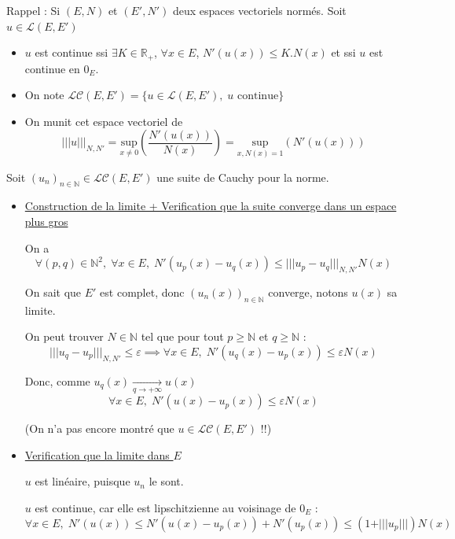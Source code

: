 \begin{myproof}{}{}
  Rappel : Si $(E, N)$ et $(E', N')$ deux espaces vectoriels normés. Soit $u\in \mathscr{L}(E, E')$
 
  \begin{itemize}
    \item $u$ est continue ssi $\exists K \in \mathbb{R} _ +$, $\forall x\in E$, $N'(u(x)) \le K.N(x)$ et ssi $u$ est continue en $0_E$.
    \item On note $\mathscr{LC}(E, E') = \{ u \in \mathscr{L}(E, E'),\; u \text{ continue}\}$
    \item On munit cet espace vectoriel de 
      \[
        \vert\vert\vert u\vert\vert\vert _{N, N'} = \underset{x \ne 0}{\mathrm{sup}} \left( \frac{N'(u(x))}{N(x)} \right) = \underset{x,N(x) = 1}{\mathrm{sup}}(N'(u(x)))
      \]
  \end{itemize}
  Soit $(u_n) _{n \in \mathbb{N}}\in \mathscr{LC}(E, E')$ une suite de Cauchy pour la norme. 

  \begin{itemize}

      \item \underline{Construction de la limite + Verification que la suite converge dans un espace plus gros}

        On a 
        \[
          \forall (p,q) \in \mathbb{N} ^{2}, \; \forall x\in E, \; N'(u _p (x) - u _q (x) ) \le \vert\vert\vert u_p - u_q\vert\vert\vert _{N, N'} N(x)
        \]

        On sait que $E'$ est complet, donc $(u_n(x)) _{n \in \mathbb{N}}$ converge, notons $u(x)$ sa limite. 

        On peut trouver $N \in \mathbb{N}$ tel que pour tout $p \ge \mathbb{N}$ et $q \ge \mathbb{N}$ :
        \[
          \vert\vert\vert u_q -u_p \vert\vert\vert _{N, N'} \le \varepsilon \implies \forall x\in E, \; N'(u_q(x) - u_p(x)) \le \varepsilon N(x) 
        \]

       Donc, comme $u_q(x) \underset{q \to + \infty}{\longrightarrow} u(x)$
       \[
          \forall x\in E, \; N'(u(x) - u_p(x)) \le \varepsilon N(x)
       \]

       (On n'a pas encore montré que $u \in \mathscr{LC}(E, E')$ !!)
     \item \underline{Verification que la limite dans $E$}

       $u$ est linéaire, puisque $u_n$ le sont.

       $u$ est continue, car elle est lipschitzienne au voisinage de $0_E$ : 
       \[
        \forall x\in E, \; N'(u(x))\le N'(u(x) - u_p(x)) + N'(u_p(x)) \le (1 + \vert\vert\vert u_p \vert\vert\vert)N(x)
       \]


  \end{itemize}
\end{myproof}



